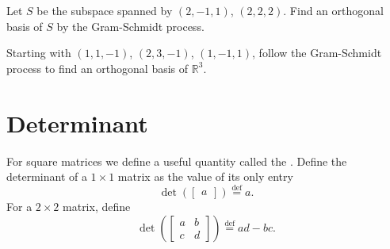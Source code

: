 \begin{exercise}
Let $S$ be the subspace spanned by
$(2,-1,1)$, $(2,2,2)$.  Find an orthogonal basis of $S$
by the Gram-Schmidt process.
\end{exercise}

\begin{exercise}
Starting with $(1,1,-1)$, $(2,3,-1)$, $(1,-1,1)$, follow the Gram-Schmidt
process to find an orthogonal basis of ${\mathbb{R}}^3$.
\end{exercise}


\sectionnewpage
\section{Determinant}
\label{det:section}


For square matrices we define a useful quantity called the
\emph{}.  Define
the determinant of a $1 \times 1$ matrix as the value of its only entry
\begin{equation*}
\det \left(
\begin{bmatrix}
a 
\end{bmatrix}
\right)
\overset{\text{def}}{=}
a .
\end{equation*}
For a $2 \times 2$ matrix, define
\begin{equation*}
\det \left(
\begin{bmatrix}
a & b \\
c & d
\end{bmatrix}
\right)
\overset{\text{def}}{=}
ad-bc .
\end{equation*}

